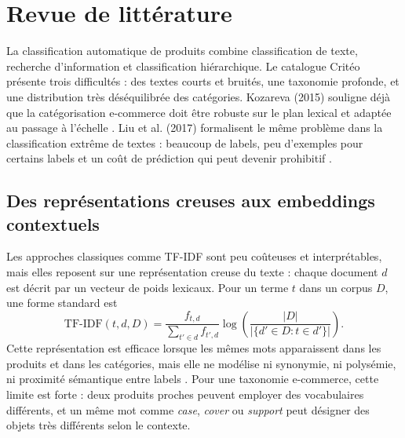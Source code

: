 \documentclass[12pt,a4paper]{report}
\begin{document}
\chapter{Revue de littérature}
\label{chap:literature-review}

La classification automatique de produits combine classification de texte, recherche d'information et classification hiérarchique. Le catalogue Critéo présente trois difficultés : des textes courts et bruités, une taxonomie profonde, et une distribution très déséquilibrée des catégories. Kozareva (2015) souligne déjà que la catégorisation e-commerce doit être robuste sur le plan lexical et adaptée au passage à l'échelle \cite{kozareva2015everyone}. Liu et al. (2017) formalisent le même problème dans la classification extrême de textes : beaucoup de labels, peu d'exemples pour certains labels et un coût de prédiction qui peut devenir prohibitif \cite{liu2017xmlcnn}.

\section{Des représentations creuses aux embeddings contextuels}
\label{sec:lit-transformers}

Les approches classiques comme TF-IDF sont peu coûteuses et interprétables, mais elles reposent sur une représentation creuse du texte : chaque document $d$ est décrit par un vecteur de poids lexicaux. Pour un terme $t$ dans un corpus $D$, une forme standard est
\begin{equation}
    \text{TF-IDF}(t,d,D)
    =
    \frac{f_{t,d}}{\sum_{t'\in d}f_{t',d}}
    \log\left(\frac{|D|}{|\{d'\in D:t\in d'\}|}\right).
\end{equation}
Cette représentation est efficace lorsque les mêmes mots apparaissent dans les produits et dans les catégories, mais elle ne modélise ni synonymie, ni polysémie, ni proximité sémantique entre labels \cite{salton1988term}. Pour une taxonomie e-commerce, cette limite est forte : deux produits proches peuvent employer des vocabulaires différents, et un même mot comme \textit{case}, \textit{cover} ou \textit{support} peut désigner des objets très différents selon le contexte.
\end{document}
